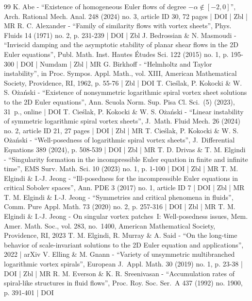 \begin{thebibliography}{99}
K. Abe - “Existence of homogeneous Euler flows of degree $-\alpha \notin [-2,0]$”, Arch. Rational Mech. Anal. 248 (2024) no. 3, article ID 30, 72 pages | DOI | Zbl | MR
R. C. Alexander - “Family of similarity flows with vortex sheets”, Phys. Fluids 14 (1971) no. 2, p. 231-239 | DOI | Zbl
J. Bedrossian \& N. Masmoudi - “Inviscid damping and the asymptotic stability of planar shear flows in the 2D Euler equations”, Publ. Math. Inst. Hautes Études Sci. 122 (2015) no. 1, p. 195-300 | DOI | Numdam | Zbl | MR
G. Birkhoff - “Helmholtz and Taylor instability”, in Proc. Sympos. Appl. Math., vol. XIII, American Mathematical Society, Providence, RI, 1962, p. 55-76 | Zbl | DOI
T. Cieślak, P. Kokocki \& W. S. Ożański - “Existence of nonsymmetric logarithmic spiral vortex sheet solutions to the 2D Euler equations”, Ann. Scuola Norm. Sup. Pisa Cl. Sci. (5) (2023), 31 p., online | DOI
T. Cieślak, P. Kokocki \& W. S. Ożański - “Linear instability of symmetric logarithmic spiral vortex sheets”, J. Math. Fluid Mech. 26 (2024) no. 2, article ID 21, 27 pages | DOI | Zbl | MR
T. Cieślak, P. Kokocki \& W. S. Ożański - “Well-posedness of logarithmic spiral vortex sheets”, J. Differential Equations 389 (2024), p. 508-539 | DOI | Zbl | MR
T. D. Drivas \& T. M. Elgindi - “Singularity formation in the incompressible Euler equation in finite and infinite time”, EMS Surv. Math. Sci. 10 (2023) no. 1, p. 1-100 | DOI | Zbl | MR
T. M. Elgindi \& I.-J. Jeong - “Ill-posedness for the incompressible Euler equations in critical Sobolev spaces”, Ann. PDE 3 (2017) no. 1, article ID 7 | DOI | Zbl | MR
T. M. Elgindi \& I.-J. Jeong - “Symmetries and critical phenomena in fluids”, Comm. Pure Appl. Math. 73 (2020) no. 2, p. 257-316 | DOI | Zbl | MR
T. M. Elgindi \& I.-J. Jeong - On singular vortex patches I: Well-posedness issues, Mem. Amer. Math. Soc., vol. 283, no. 1400, American Mathematical Society, Providence, RI, 2023
T. M. Elgindi, R. Murray \& A. Said - “On the long-time behavior of scale-invariant solutions to the 2D Euler equation and applications”, 2022 | arXiv
V. Elling \& M. Gnann - “Variety of unsymmetric multibranched logarithmic vortex spirals”, European J. Appl. Math. 30 (2019) no. 1, p. 23-38 | DOI | Zbl | MR
R. M. Everson \& K. R. Sreenivasan - “Accumulation rates of spiral-like structures in fluid flows”, Proc. Roy. Soc. Ser. A 437 (1992) no. 1900, p. 391-401 | DOI

\end{thebibliography}
